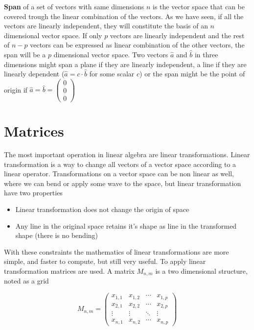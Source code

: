 \textbf{Span} of a set of vectors with same dimensions \(n\) is the vector space that can be covered trough the linear combination of the vectors. As we have seen, if all the vectors are linearly independent, they will constitute the basis of an \(n\) dimensional vector space. If only \(p\) vectors are linearly independent and the rest of \(n - p\) vectors can be expressed as linear combination of the other vectors, the span will be a \(p\) dimensional vector space. Two vectors \(\hat{a}\) and \(\hat{b}\) in three dimensions might span a plane if they are linearly independent, a line if they are linearly dependent (\(\hat{a} = c \cdot \hat{b}\) for some scalar \(c\)) or the span might be the point of origin if \(\hat{a} = \hat{b} = \begin{pmatrix} 0 \\ 0 \\ 0 \end{pmatrix}\)

\section{Matrices}

The most important operation in linear algebra are linear transformations. Linear transformation is a way to change all vectors of a vector space according to a linear operator. Transformations on a vector space can be non linear as well, where we can bend or apply some wave to the space, but linear transformation have two properties

\begin{itemize}
    \item Linear transformation does not change the origin of space
    \item Any line in the original space retains it's shape as line in the transformed shape (there is no bending)
\end{itemize}

With these constraints the mathematics of linear transformations are more simple, and faster to compute, but still very useful. To apply linear transformation matrices are used. A matrix \(M_{n,m}\) is a two dimensional structure, noted as a grid

\[M_{n,m} =  \begin{pmatrix}
  x_{1,1} & x_{1,2} & \cdots & x_{1,p} \\
  x_{2,1} & x_{2,2} & \cdots & x_{2,p} \\
  \vdots  & \vdots  & \ddots & \vdots  \\
  x_{n,1} & x_{n,2} & \cdots & x_{n,p}
 \end{pmatrix}\]

